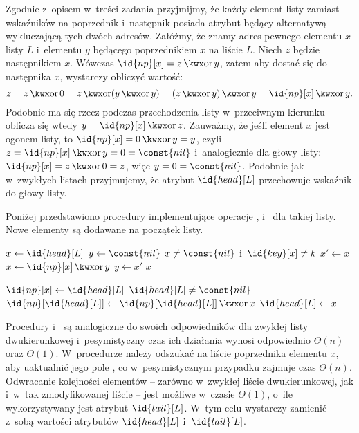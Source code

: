 \exercise %
Zgodnie z~opisem w~treści zadania przyjmijmy, że każdy element listy zamiast wskaźników na poprzednik i~następnik posiada atrybut  będący alternatywą wykluczającą tych dwóch adresów. Załóżmy, że znamy adres pewnego elementu $x$ listy $L$ i~elementu $y$ będącego poprzednikiem $x$ na liście $L$. Niech $z$ będzie następnikiem $x$. Wówczas $\id{np}[x]=z\BitXor y$, zatem aby dostać się do następnika $x$, wystarczy obliczyć wartość:
\[
    z = z\BitXor0 = z\BitXor(y\BitXor y) = (z\BitXor y)\BitXor y = \id{np}[x]\BitXor y.
\]
Podobnie ma się rzecz podczas przechodzenia listy w~przeciwnym kierunku -- oblicza się wtedy $y=\id{np}[x]\BitXor z$. Zauważmy, że jeśli element $x$ jest ogonem listy, to $\id{np}[x]=0\BitXor y=y$, czyli $z=\id{np}[x]\BitXor y=0=\const{nil}$ i~analogicznie dla głowy listy: $\id{np}[x]=z\BitXor0=z$, więc $y=0=\const{nil}$. Podobnie jak w~zwykłych listach przyjmujemy, że atrybut $\id{head}[L]$ przechowuje wskaźnik do głowy listy.

Poniżej przedstawiono procedury implementujące operacje ,  i~ dla takiej listy. Nowe elementy są dodawane na początek listy.

\begin{codebox}
\li	$x\gets\id{head}[L]$
\li	$y\gets\const{nil}$
\li	\While $x\ne\const{nil}$ i~$\id{key}[x]\ne k$
\li		\Do
			$x'\gets x$
\li			$x\gets\id{np}[x]\BitXor y$
\li			$y\gets x'$
		\End
\li	\Return $x$
\end{codebox}

\begin{codebox}
\li	$\id{np}[x]\gets\id{head}[L]$
\li	\If $\id{head}[L]\ne\const{nil}$
\li		\Then $\id{np}[\id{head}[L]]\gets\id{np}[\id{head}[L]]\BitXor x$
		\End
\li	$\id{head}[L]\gets x$
\end{codebox}


Procedury  i~ są analogiczne do swoich odpowiedników dla zwykłej listy dwukierunkowej i~pesymistyczny czas ich działania wynosi odpowiednio $\Theta(n)$ oraz $\Theta(1)$. W~procedurze  należy odszukać na liście poprzednika elementu $x$, aby uaktualnić jego pole , co w~pesymistycznym przypadku zajmuje czas $\Theta(n)$. Odwracanie kolejności elementów -- zarówno w~zwykłej liście dwukierunkowej, jak i~w~tak zmodyfikowanej liście -- jest możliwe w~czasie $\Theta(1)$, o~ile wykorzystywany jest atrybut $\id{tail}[L]$. W~tym celu wystarczy zamienić z~sobą wartości atrybutów $\id{head}[L]$ i~$\id{tail}[L]$. 

